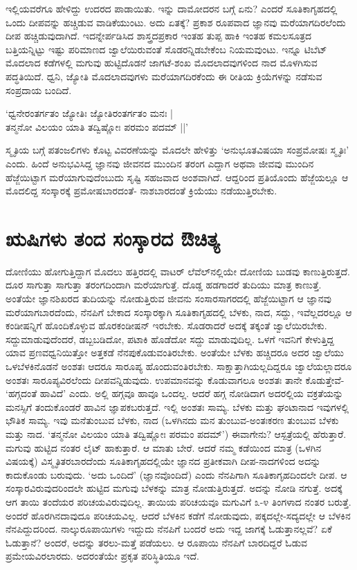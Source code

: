 ಇಲ್ಲಿಯವರೆಗೂ ಹೇಳಿದ್ದು ಉದರದ ಪಾಡಾಯಿತು. ಇನ್ನು ದಾಮೋದರನ ಬಗ್ಗೆ ಏನು? ಎಂದರೆ ಸೂತಿಕಾಗೃಹದಲ್ಲಿ ಒಂದು ದೀಪವನ್ನು ಹಚ್ಚಿಡುವ ವಾಡಿಕೆಯುಂಟು. ಅದು ಏತಕ್ಕೆ? ಪ್ರಕಾಶ ರೂಪವಾದ ಜ್ಞಾನವು ಮರೆಯಾಗದಿರಲೆಂದು ದೀಪ ಹಚ್ಚಿಡುವುದಾಗಿದೆ. ಇದನ್ನೇರ್ಪಡಿಸಿದ ಶಾಸ್ತ್ರದಪ್ರಕಾರ ಇಂತಹ ತುಪ್ಪ ಹಾಕಿ ಇಂತಹ ಕಮಲಸೂತ್ರದ ಬತ್ತಿಯನ್ನಿಟ್ಟು ಇಷ್ಟು ಪರಿಮಾಣದ ಜ್ವಾಲೆಯಿರುವಂತೆ ಸೊಡರನ್ನಿಡಬೇಕೆಂಬ ನಿಯಮವುಂಟು. ಇನ್ನೂ ಟಿಬೆಟ್ ಮೊದಲಾದ ಕಡೆಗಳಲ್ಲಿ ಮಗುವು ಹುಟ್ಟಿದೊಡನೆ ಜಾಗಟೆ-ಶಂಖ ಮೊದಲಾದವುಗಳಿಂದ ನಾದ ಮೊಳಗಿಸುವ ಪದ್ಧತಿಯಿದೆ. ಧ್ವನಿ, ಜ್ಯೋತಿ ಮೊದಲಾದವುಗಳು ಮರೆಯಾಗದಿರಕೆಂದು ಈ ರೀತಿಯ ಕ್ರಿಯೆಗಳನ್ನು ನಡೆಸುವ ಸಂಪ್ರದಾಯ ಬಂದಿದೆ.

\begin{shloka}
`ಧ್ವನೇರಂತರ್ಗತಂ ಜ್ಯೋತಿಃ ಜ್ಯೋತಿರಂತರ್ಗತಂ ಮನಃ |\label{87}\\
ತನ್ಮನೋ ವಿಲಯಂ ಯಾತಿ ತದ್ವಿಷ್ಣೋಃ ಪರಮಂ ಪದಮ್ ||'
\end{shloka}

ಸ್ಮೃತಿಯ ಬಗ್ಗೆ ಪತಂಜಲಿಗಳು ಕೊಟ್ಟ ವಿವರಣೆಯನ್ನು ಮೊದಲೇ ಹೇಳಿತ್ತು `ಅನುಭೂತವಿಷಯಾ ಸಂಪ್ರಮೋಷಃ ಸ್ಮೃತಿಃ' ಎಂದು. ಹಿಂದೆ ಅನುಭವಿಸಿದ್ದ ಜ್ಞಾನವು ಜೀವನದ ಮುಂದಿನ ತರಂಗ ಎದ್ದಾಗ ಅಥವಾ ಜೀವವು ಮುಂದಿನ ಹೆಜ್ಜೆಯಿಟ್ಟಾಗ ಮರೆಯಾಗುವುದೆಂಬುದು ಸೃಷ್ಟಿ ಸಹಜವಾದ ಅಂಶವಾಗಿದೆ. ಆದ್ದರಿಂದ ಪ್ರತಿಯೊಂದು ಹೆಜ್ಜೆಯಲ್ಲೂ ಆ ಮೊದಲಿದ್ದ ಸಂಸ್ಕಾರಕ್ಕೆ  ಪ್ರಮೋಷಬಾರದಂತೆ- ನಾಶಬಾರದಂತೆ ಕ್ರಿಯೆಯು ನಡೆಯುತ್ತಿರಬೇಕು.

\section*{ಋಷಿಗಳು ತಂದ ಸಂಸ್ಕಾರದ ಔಚಿತ್ಯ}

ದೋಣಿಯು ಹೋಗುತ್ತಿದ್ದಾಗ ಮೊದಲು ಹತ್ತಿರದಲ್ಲಿ ವಾಟರ್ ಲೆವೆಲ್‌ನಲ್ಲಿಯೇ ದೋಣಿಯ ಬುಡವು ಕಾಣುತ್ತಿರುತ್ತದೆ. ದೂರ ಸಾಗುತ್ತಾ ಸಾಗುತ್ತಾ ತರಂಗದಿಂದಾಗಿ ಮರೆಯಾಗುತ್ತೆ. ದೊಡ್ಡ ಹಡಗಾದರೆ ತುದಿಯು ಮಾತ್ರ ಕಾಣುತ್ತೆ. ಅಂತೆಯೇ ಜ್ಞಾನಶಿಖರದ ತುದಿಯನ್ನು ನೋಡುತ್ತಿರುವ ಜೀವನು ಸಂಸಾರಸಾಗರದಲ್ಲಿ ಹೆಜ್ಜೆಯಿಟ್ಟಾಗ ಆ ಜ್ಞಾನವು ಮರೆಯಾಗಬಾರದೆಂದು, ನೆನಪಿಗೆ ಬೇಕಾದ ಸಂಸ್ಕಾರಕ್ಕಾಗಿ ಸೂತಿಕಾಗೃಹದಲ್ಲಿ ಬೆಳಕು, ನಾದ, ಸದ್ದು, ಇವೆಲ್ಲದರಲ್ಲೂ ಆ ಕಂಡೀಷನ್ನಿಗೆ ಹೊಂದಿಕೊಳ್ಳುವ ಹೊರಕಂಡೀಷನ್ ಇರಬೇಕು. ಸೊಡರಾದರೆ ಅದಕ್ಕೆ ತಕ್ಕಂತೆ ಜ್ವಾಲೆಯಿರಬೇಕು. ಸದ್ದುಮಾಡುವುದೆಂದರೆ, ಡಬ್ಬಬಡಿದೋ, ಪಟಾಕಿ ಹೊಡೆದೋ ಸದ್ದು ಮಾಡುವುದಿಲ್ಲ. ಒಳಗೆ ಇವನಿಗೆ ಕೇಳುತ್ತಿದ್ದ ಯಾವ ಪ್ರಣವಧ್ವನಿಯಿತ್ತೋ ಅತ್ತಕಡೆ ನೆನಪುಕೊಡುವಂತಿರಬೇಕು. ಅಂತೆಯೇ ಬೆಳಕು ಹಚ್ಚಿದರೂ ಅದರ ಜ್ವಾಲೆಯು ಒಳಬೆಳಕಿನೊಡನೆ ಅಂಶತಃ ಆದರೂ ಸಾರೂಪ್ಯ ಹೊಂದುವಂತಿರಬೇಕು. ಸಾಕ್ಷಾತ್ತಾಗಿಯಲ್ಲದಿದ್ದರೂ ಜ್ವಾಲೆಯಲ್ಲಾದರೂ ಅಂಶತಃ ಸಾರೂಪ್ಯವಿರಲೆಂದು ದೀಪವನ್ನಿಡುವುದು. ಉಪಮಾನವನ್ನು ಕೊಡುವಾಗಲೂ ಅಂಶತಃ ತಾನೇ ಕೊಡುತ್ತೇವೆ- `ಹಗ್ಗದಂತೆ ಹಾವಿದೆ' ಎಂದು. ಅಲ್ಲಿ ಹಗ್ಗವೂ ಹಾವೂ ಒಂದಲ್ಲ. ಆದರೆ ಹಗ್ಗ ನೋಡಿದಾಗ ಅದರಲ್ಲಿಯ ವಕ್ರತೆಯನ್ನು ಮನಸ್ಸಿಗೆ ತಂದುಕೊಂಡರೆ ಹಾವಿನ ಜ್ಞಾಪಕಬರುತ್ತದೆ. ಇಲ್ಲಿ ಅಂಶತಃ ಸಾಮ್ಯ. ಬೆಳಕು ಮತ್ತು ಘಂಟಾನಾದ ಇವುಗಳಲ್ಲಿ ಭೌತಿಕ ಸಾಮ್ಯ. ಇವು ಮನೆತುಂಬುವ ಬೆಳಕು, ನಾದ (ಒಳಗಿನದು ಮನ ತುಂಬುವ-ಅಂತಃಕರಣ ತುಂಬುವ ಬೆಳಕು ಮತ್ತು ನಾದ. `ತನ್ಮನೋ ವಿಲಯಂ ಯಾತಿ ತದ್ವಿಷ್ಣೋಃ ಪರಮಂ ಪದಮ್') ಈವಾಗೇನು? ಆಸ್ಪತ್ರೆಯಲ್ಲಿ ಹೆರುತ್ತಾರೆ. ಮಗುವು ಹುಟ್ಟಿದ ನಂತರ ಲೈಟ್ ಹಾಕುತ್ತಾರೆ. ಆ ಮಾತು ಬೇರೆ. ಆದರೆ ನಮ್ಮ ಕಡೆಯಿಂದ ಮಾತ್ರ (ಒಳಗಿನ ವಿಷಯಕ್ಕೆ) ವಿಸ್ಮೃತಿತರಬಾರದೆಂದು ಸೂತಿಕಾಗೃಹದಲ್ಲಿಯೇ ಜ್ಞಾನದ ಪ್ರತೀಕವಾಗಿ ದೀಪ-ನಾದಗಳಿಂದ ಅದನ್ನು ಕಾದುಕೊಂಡು ಬರುವುದು. `ಅದು ಒಂದಿದೆ' (ಜ್ಞಾನವೊಂದಿದೆ) ಎಂದು ನೆನಪಿಗಾಗಿ ಸೂತಿಕಾಗೃಹದಿಂದಲೇ ದೀಪ. ಆ ಸಂಸ್ಕಾರವಿರುವುದರಿಂದಲೇ ಹುಟ್ಟಿದ ಮಗುವು ಬೆಳಕನ್ನು ಮಾತ್ರ ನೋಡುತ್ತಿರುತ್ತದೆ. ಅದನ್ನು ನೋಡಿ ನಗುತ್ತೆ. ಅದಕ್ಕೆ ಆಗ ತಾಯಿ ತಂದೆಯರ ಪರಿಚಯವಿರುವುದಿಲ್ಲ. ತಾಯಿಯ ಪರಿಚಯವೂ ಮಗುವಿಗೆ ೩-೪ ತಿಂಗಳಾದ ನಂತರ ಬರುತ್ತೆ. ಅಂದರೆ ಹೊರಗಿನದಾವುದೂ ಪರಿಚಯವಿಲ್ಲ. ಆದರೆ ಬೆಳಕಿನ ಕಡೆಗೆ ನೋಡುವುದು, ಪಕ್ಕದಲ್ಲೇ-ಸದ್ಯದಲ್ಲೇ ಆ ಬೆಳಕಿನ ನೆನಪಿದ್ದುದರಿಂದ. ನಾಲ್ಕುರೂಪಾಯಿಗಳು ಇದ್ದುದು ನೆನಪಿಗೆ ಬಂದರೆ ಅದು ಇದ್ದ ಜಾಗಕ್ಕೆ ಓಡುತ್ತಾನಲ್ಲವೆ? ಏಕೆ ಓಡುತ್ತಾನೆ? ಅಂದರೆ, ಅದನ್ನು ತರಲು-ಮತ್ತೆ ಪಡೆಯಲು. ಆ ರೂಪಾಯಿ ನೆನಪಿಗೆ ಬಾರದಿದ್ದರೆ ಓಡುವ ಪ್ರಮೇಯವಿರಲಾರದು. ಅದರಂತೆಯೇ ಪ್ರಕೃತ ಪರಿಸ್ಥಿತಿಯೂ ಇದೆ.

